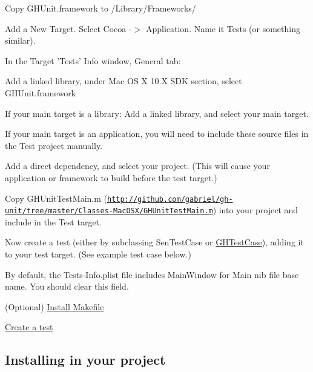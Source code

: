 \begin{DoxyItemize}
\item \-Copy {\ttfamily \-G\-H\-Unit.\-framework} to {\ttfamily /\-Library/\-Frameworks/}
\item \-Add a {\ttfamily \-New \-Target}. \-Select {\ttfamily \-Cocoa -\/$>$ \-Application}. \-Name it {\ttfamily \-Tests} (or something similar).
\item \-In the {\ttfamily \-Target '\-Tests' \-Info} window, {\ttfamily \-General} tab\-:
\begin{DoxyItemize}
\item \-Add a linked library, under {\ttfamily \-Mac \-O\-S \-X 10.\-X \-S\-D\-K} section, select {\ttfamily \-G\-H\-Unit.\-framework}
\item \-If your main target is a library\-: \-Add a linked library, and select your main target.
\item \-If your main target is an application, you will need to include these source files in the {\ttfamily \-Test} project manually.
\item \-Add a direct dependency, and select your project. (\-This will cause your application or framework to build before the test target.)
\end{DoxyItemize}
\item \-Copy \-G\-H\-Unit\-Test\-Main.\-m (\href{http://github.com/gabriel/gh-unit/tree/master/Classes-MacOSX/GHUnitTestMain.m}{\tt http\-://github.\-com/gabriel/gh-\/unit/tree/master/\-Classes-\/\-Mac\-O\-S\-X/\-G\-H\-Unit\-Test\-Main.\-m}) into your project and include in the \-Test target.
\item \-Now create a test (either by subclassing {\ttfamily \-Sen\-Test\-Case} or {\ttfamily \hyperlink{interface_g_h_test_case}{\-G\-H\-Test\-Case}}), adding it to your test target. (\-See example test case below.)
\item \-By default, the \-Tests-\/\-Info.\-plist file includes {\ttfamily \-Main\-Window} for {\ttfamily \-Main nib file base name}. \-You should clear this field.
\item (\-Optional) \hyperlink{_command_line_Makefile}{\-Install \-Makefile}
\item \hyperlink{_examples}{\-Create a test}
\end{DoxyItemize}\hypertarget{_installing_InstallProject}{}\subsection{\-Installing in your project}\label{_installing_InstallProject}

